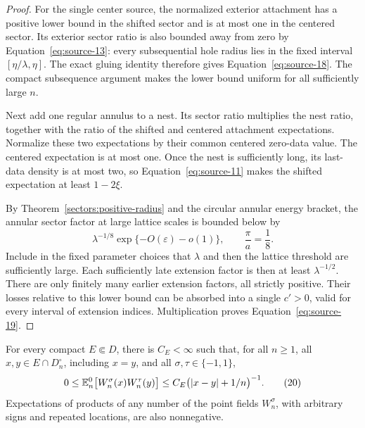 \begin{proof}
For the single center source, the normalized exterior attachment
has a positive lower bound in the shifted sector and is at most
one in the centered sector.  Its exterior sector ratio is also
bounded away from zero by Equation~\eqref{eq:source-13}:
every subsequential hole radius lies in the fixed interval
\([\eta/\lambda,\eta]\).  The exact gluing identity therefore
gives Equation~\eqref{eq:source-18}.  The compact subsequence
argument makes the lower bound uniform for all sufficiently
large \(n\).

Next add one regular annulus to a nest.  Its sector ratio
multiplies the nest ratio, together with the ratio of the
shifted and centered attachment expectations.  Normalize these
two expectations by their common centered zero-data value.
The centered expectation is at most one.  Once the nest is
sufficiently long, its last-data density is at most two, so
Equation~\eqref{eq:source-11} makes the shifted expectation at
least \(1-2\xi\).

By Theorem~\ref{sectors:positive-radius} and the circular annular
energy bracket, the annular sector factor at large lattice scales
is bounded below by
\[
 \lambda^{-1/8}\exp\{-O(\varepsilon)-o(1)\},
 \qquad \frac{\pi}{a}=\frac18.
\]
Include in the fixed parameter choices that \(\lambda\) and then
the lattice threshold are sufficiently large.  Each sufficiently
late extension factor is then at least \(\lambda^{-1/2}\).
There are only finitely many earlier extension factors, all
strictly positive.  Their losses relative to this lower bound
can be absorbed into a single \(c'>0\), valid for every interval
of extension indices.  Multiplication proves
Equation~\eqref{eq:source-19}.
\end{proof}

\begin{proposition}
\label{correlations:diagonal}
For every compact \(E\Subset D\), there is \(C_E<\infty\) such that,
for all \(n\geq1\), all \(x,y\in E\cap D_n^\circ\), including \(x=y\),
and all \(\sigma,\tau\in\{-1,1\}\),
\begin{equation}
 0\leq\mathbb E_n^0\bigl[W_n^\sigma(x)W_n^\tau(y)\bigr]
       \leq C_E\bigl(|x-y|+1/n\bigr)^{-1}.
 \tag{20}\label{eq:source-20}
\end{equation}
Expectations of products of any number of the point fields
\(W_n^\sigma\), with arbitrary signs and repeated locations, are
also nonnegative.
\end{proposition}

